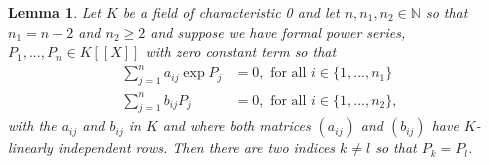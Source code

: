 \documentclass{article}
\newtheorem{lemma}{Lemma}[section]
\newcommand{\mbb}[1]{\mathbb{#1}}
\numberwithin{equation}{section}
\begin{document}
\begin{lemma} \label{lem: Two power series are equal}
    Let $K$ be a field of characteristic 0 and let $n,n_1,n_2 \in \mbb N$ so that $n_1 = n - 2$ and $n_2 \geq 2$ and suppose we have formal power series, $P_1, ..., P_n \in K[[X]]$ with zero constant term so that
    \begin{align*}
        \sum_{j = 1}^n a_{ij} \exp P_j & = 0, \text{ for all } i \in \{1, ..., n_1\}  \\
        \sum_{j = 1}^n b_{ij} P_j      & = 0, \text{ for all } i \in \{1, ..., n_2\},
    \end{align*}
    with the $a_{ij}$ and $b_{ij}$ in $K$ and where both matrices $(a_{ij})$ and $(b_{ij})$ have $K$-linearly independent rows. Then there are two indices $k \neq l$ so that $P_k = P_l$.
\end{lemma}
\end{document}
